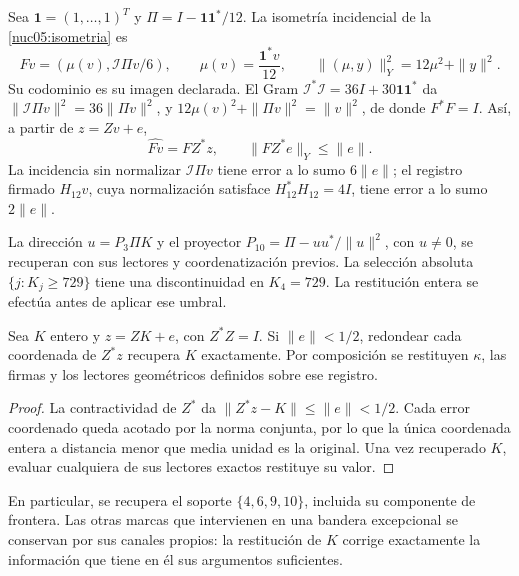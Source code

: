 Sea \(\mathbf1=(1,\ldots,1)^T\) y
\(\Pi=I-\mathbf1\mathbf1^*/12\). La isometría incidencial de
la \cref{nuc05:isometria} es
\begin{equation}
 Fv=(\mu(v),\mathcal I\Pi v/6),\qquad
 \mu(v)=\frac{\mathbf1^*v}{12},\qquad
 \|(\mu,y)\|_Y^2=12\mu^2+\|y\|^2.
 \label{lib04:f-incidencia}
\end{equation}
Su codominio es su imagen declarada. El Gram
\(\mathcal I^*\mathcal I=36I+30\mathbf1\mathbf1^*\) da
\(\|\mathcal I\Pi v\|^2=36\|\Pi v\|^2\), y
\(12\mu(v)^2+\|\Pi v\|^2=\|v\|^2\), de donde \(F^*F=I\).
Así, a partir de \(z=Zv+e\),
\begin{equation}
 \widehat{Fv}=FZ^*z,\qquad \|FZ^*e\|_Y\leq\|e\|.
 \label{lib04:error-incidencia}
\end{equation}
La incidencia sin normalizar \(\mathcal I\Pi v\) tiene error a
lo sumo \(6\|e\|\); el registro firmado \(H_{12}v\), cuya
normalización satisface \(H_{12}^*H_{12}=4I\), tiene error a lo sumo
\(2\|e\|\).

La dirección \(u=P_3\Pi K\) y el proyector
\(P_{10}=\Pi-uu^*/\|u\|^2\), con \(u\neq0\), se recuperan
con sus lectores y coordenatización previos. La selección absoluta
\(\{j:K_j\geq729\}\) tiene una discontinuidad en \(K_4=729\).
La restitución entera se efectúa antes de aplicar ese umbral.

\begin{proposition}
\label{lib04:prop-redondeo}
Sea \(K\) entero y \(z=ZK+e\), con \(Z^*Z=I\). Si
\(\|e\|<1/2\), redondear cada coordenada de \(Z^*z\) recupera
\(K\) exactamente. Por composición se restituyen \(\kappa\), las
firmas y los lectores geométricos definidos sobre ese registro.
\end{proposition}

\begin{proof}
La contractividad de \(Z^*\) da
\(\|Z^*z-K\|\leq\|e\|<1/2\). Cada error coordenado queda
acotado por la norma conjunta, por lo que la única coordenada entera
a distancia menor que media unidad es la original. Una vez
recuperado \(K\), evaluar cualquiera de sus lectores exactos
restituye su valor.
\end{proof}

En particular, se recupera el soporte \(\{4,6,9,10\}\), incluida
su componente de frontera. Las otras marcas que intervienen en una
bandera excepcional se conservan por sus canales propios: la
restitución de \(K\) corrige exactamente la información que tiene
en él sus argumentos suficientes.

